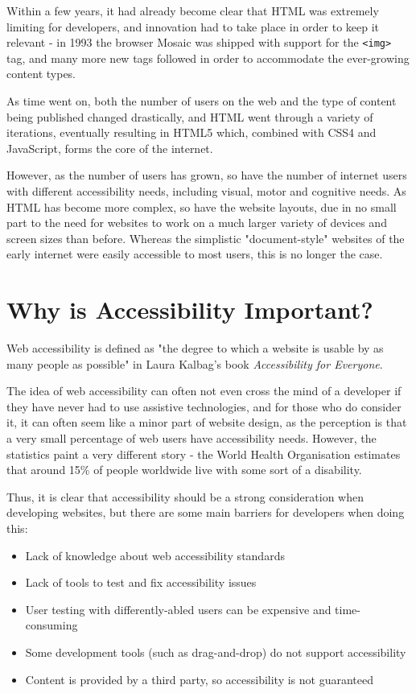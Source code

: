 \documentclass[ %
                    author={Aleena Baig},
                supervisor={Dr Simon Lock},
                    degree={BSc},
                     title={On Making Web Accessible Graphs},
                  subtitle={},
                      year={2019} ]{dissertation}
\begin{document}
Within a few years, it had already become clear that HTML was extremely limiting for developers, and innovation had to take place in order to keep it relevant - in 1993 the browser Mosaic was shipped with support for the \texttt{<img>} tag, and many more new tags followed in order to accommodate the ever-growing content types.\cite{historyofhtml}

As time went on, both the number of users on the web and the type of content being published changed drastically, and HTML went through a variety of iterations, eventually resulting in HTML5 which, combined with CSS4 and JavaScript, forms the core of the internet.

However, as the number of users has grown, so have the number of internet users with different accessibility needs, including visual, motor and cognitive needs. As HTML has become more complex, so have the website layouts, due in no small part to the need for websites to work on a much larger variety of devices and screen sizes than before. Whereas the simplistic "document-style" websites of the early internet were easily accessible to most users, this is no longer the case.

\section{Why is Accessibility Important?}

Web accessibility is defined as "the degree to which a
website is usable by as many people as possible" in Laura Kalbag's book \textit{Accessibility for Everyone}.\cite{accessibilityforeveryone}

The idea of web accessibility can often not even cross the mind of a developer if they have never had to use assistive technologies, and for those who do consider it, it can often seem like a minor part of website design, as the perception is that a very small percentage of web users have accessibility needs.
However, the statistics paint a very different story - the World Health Organisation estimates that around 15\% of people worldwide live with some sort of a disability.\cite{WHOdisability}

Thus, it is clear that accessibility should be a strong consideration when developing websites, but there are some main barriers for developers when doing this:

\begin{itemize}
    \item Lack of knowledge about web accessibility standards
    \item Lack of tools to test and fix accessibility issues
    \item User testing with differently-abled users can be expensive and time-consuming
    \item Some development tools (such as drag-and-drop) do not support accessibility
    \item Content is provided by a third party, so accessibility is not guaranteed
\end{itemize}
\end{document}
